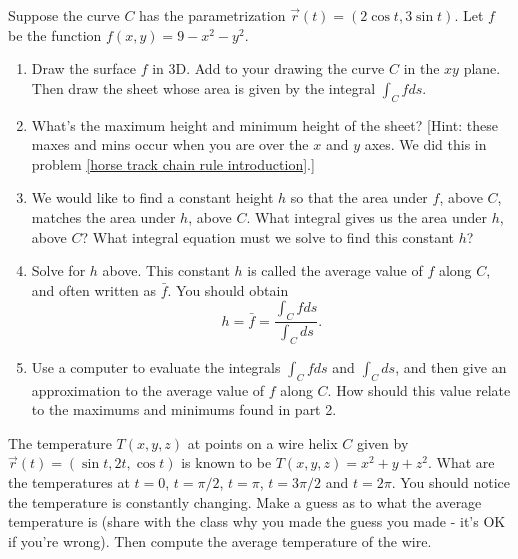 \begin{problem}\label{Average Value intro}%
%
 Suppose the curve $C$ has the parametrization $\vec r(t) = (2\cos t, 3\sin t)$.  Let $f$ be the function $f(x,y)=9-x^2-y^2$.    \begin{enumerate}
  \item Draw the surface $f$ in 3D.  Add to your drawing the curve $C$ in the $xy$ plane. Then draw the sheet whose area is given by the integral $\int_C f ds$. 
  \item What's the maximum height and minimum height of the sheet? [Hint: these maxes and mins occur when you are over the $x$ and $y$ axes. We did this in problem \ref{horse track chain rule introduction}.]
  \item We would like to find a constant height $h$ so that the area under $f$, above $C$, matches the area under $h$, above $C$. What integral gives us the area under $h$, above $C$?  What integral equation must we solve to find this constant $h$?
  \item {}%
Solve for $h$ above. This constant $h$ is called the average value of $f$ along $C$, and often written as $\bar f$. You should obtain $$h=\bar f = \frac{\int_C f ds}{\int_C ds}.$$
  \item Use a computer to evaluate the integrals $\int_C f ds$ and $\int_C ds$, and then give an approximation to the average value of $f$ along $C$. How should this value relate to the maximums and minimums found in part 2.
 \end{enumerate}
\end{problem}

\begin{problem}
 The temperature $T(x,y,z)$ at points on a wire helix $C$ given by $\vec r(t) = (\sin t, 2t, \cos t)$ is known to be $T(x,y,z)=x^2+y+z^2$. What are the temperatures at $t=0$, $t=\pi/2$, $t=\pi$, $t=3\pi/2$ and $t=2\pi$.  You should notice the temperature is constantly changing.  Make a guess as to what the average temperature is (share with the class why you made the guess you made - it's OK if you're wrong). Then compute the average temperature of the wire.
\end{problem}

